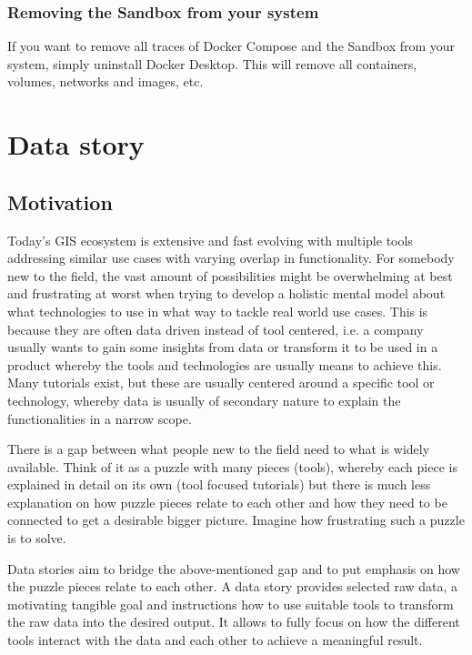 \documentclass[11pt, a4paper, oneside, parskip=full-]{scrartcl}
\begin{document}
\subsubsection*{Removing the Sandbox from your system}
If you want to remove all traces of Docker Compose and the Sandbox from your
system, simply uninstall Docker Desktop. This will remove all containers,
volumes, networks and images, etc.

\section{Data story}

\subsection{Motivation}
Today's GIS ecosystem is extensive and fast evolving with multiple tools
addressing similar use cases with varying overlap in functionality. For somebody
new to the field, the vast amount of possibilities might be overwhelming at best
and frustrating at worst when trying to develop a holistic mental model about
what technologies to use in what way to tackle real world use cases. This is
because they are often data driven instead of tool centered, i.e. a company
usually wants to gain some insights from data or transform it to be used in a
product whereby the tools and technologies are usually means to achieve this.
Many tutorials exist, but these are usually centered around a specific tool or
technology, whereby data is usually of secondary nature to explain the
functionalities in a narrow scope.

There is a gap between what people new to the field need to what is widely
available. Think of it as a puzzle with many pieces (tools), whereby each piece
is explained in detail on its own (tool focused tutorials) but there is much
less explanation on how puzzle pieces relate to each other and how they need to
be connected to get a desirable bigger picture. Imagine how frustrating such a
puzzle is to solve.

Data stories aim to bridge the above-mentioned gap and to put emphasis on how
the puzzle pieces relate to each other. A data story provides selected raw data,
a motivating tangible goal and instructions how to use suitable tools to
transform the raw data into the desired output. It allows to fully focus on how
the different tools interact with the data and each other to achieve a
meaningful result.
\end{document}
